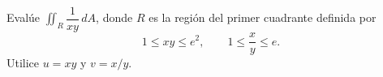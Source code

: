Evalúe $\iint_R \dfrac{1}{xy}\,dA$, donde $R$ es la región del primer cuadrante definida por
\[
1\leq xy\leq e^2,\qquad 1\leq \frac{x}{y}\leq e.
\]
Utilice $u=xy$ y $v=x/y$.
